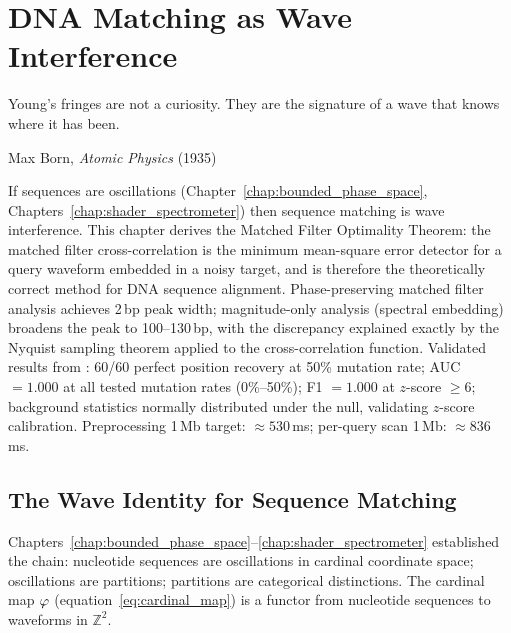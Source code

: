 
\chapter{DNA Matching as Wave Interference}
\label{chap:wave_interference}

\epigraph{%
  Young's fringes are not a curiosity. They are the signature of a wave that
  knows where it has been.%
}{Max Born, \textit{Atomic Physics} (1935)}

\begin{chapterbox}
If sequences are oscillations (Chapter~\ref{chap:bounded_phase_space},
Chapters~\ref{chap:shader_spectrometer}) then sequence matching is wave
interference. This chapter derives the Matched Filter Optimality Theorem: the
matched filter cross-correlation is the minimum mean-square error detector for
a query waveform embedded in a noisy target, and is therefore the theoretically
correct method for DNA sequence alignment. Phase-preserving matched filter
analysis achieves 2\,bp peak width; magnitude-only analysis (spectral embedding)
broadens the peak to 100--130\,bp, with the discrepancy explained exactly by
the Nyquist sampling theorem applied to the cross-correlation function.
Validated results from \citet{Sachikonye2025_Interference}: 60/60 perfect
position recovery at 50\% mutation rate; AUC $= 1.000$ at all tested mutation
rates (0\%--50\%); F1 $= 1.000$ at $z$-score $\geq 6$; background statistics
normally distributed under the null, validating $z$-score calibration.
Preprocessing 1\,Mb target: $\approx 530$\,ms; per-query scan 1\,Mb:
$\approx 836$\,ms.
\end{chapterbox}

\section{The Wave Identity for Sequence Matching}
\label{sec:wave_identity}

Chapters~\ref{chap:bounded_phase_space}--\ref{chap:shader_spectrometer}
established the chain: nucleotide sequences are oscillations in cardinal
coordinate space; oscillations are partitions; partitions are categorical
distinctions. The cardinal map $\varphi$ (equation~\eqref{eq:cardinal_map})
is a functor from nucleotide sequences to waveforms in $\mathbb{Z}^2$.

